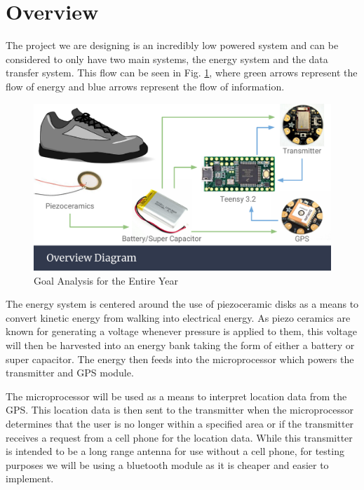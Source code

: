 \documentclass[letterpaper, 12 pt, onecolumn, hidelinks]{ieeetran}
\begin{document}
\section{Overview}\label{sec:Overview}
The project we are designing is an incredibly low powered system and can be considered to only have two main systems, the energy system and the data transfer system. This flow can be seen in Fig. \ref{fig:Diagram}, where green arrows represent the flow of energy and blue arrows represent the flow of information.

\begin{figure}[h]
	\begin{center}
		\includegraphics[trim=0 65 0 0, clip, width=\columnwidth]{OverviewDiagram.pdf}
	\end{center}
	\vspace{-1em}
	\caption{\label{fig:Diagram}Goal Analysis for the Entire Year}
\end{figure}

The energy system is centered around the use of piezoceramic disks as a means to convert kinetic energy from walking into electrical energy. As piezo ceramics are known for generating a voltage whenever pressure is applied to them, this voltage will then be harvested into an energy bank taking the form of either a battery or super capacitor. The energy then feeds into the microprocessor which powers the transmitter and GPS module.

The microprocessor will be used as a means to interpret location data from the GPS. This location data is then sent to the transmitter when the microprocessor determines that the user is no longer within a specified area or if the transmitter receives a request from a cell phone for the location data. While this transmitter is intended to be a long range antenna for use without a cell phone, for testing purposes we will be using a bluetooth module as it is cheaper and easier to implement.
\end{document}
